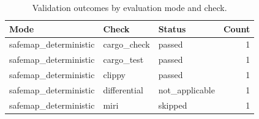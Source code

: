 \begin{table}[t]
\centering
\caption{Validation outcomes by evaluation mode and check.}
\label{tab:safemap-validation-statuses}
\begin{tabular}{lllr}
\hline
Mode & Check & Status & Count \\
\hline
safemap\_deterministic & cargo\_check & passed & 1 \\
safemap\_deterministic & cargo\_test & passed & 1 \\
safemap\_deterministic & clippy & passed & 1 \\
safemap\_deterministic & differential & not\_applicable & 1 \\
safemap\_deterministic & miri & skipped & 1 \\
\hline
\end{tabular}
\end{table}
